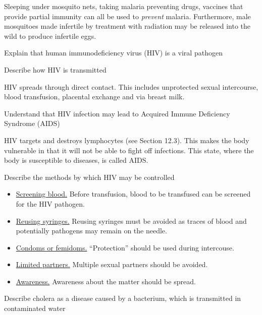 Sleeping under mosquito nets, taking malaria preventing drugs, vaccines that provide partial
immunity can all be used to \emph{prevent} malaria. Furthermore, male mosquitoes made infertile
by treatment with radiation may be released into the wild to produce infertile eggs.

\begin{point}
Explain that human immunodeficiency virus (HIV) is a viral pathogen
\end{point}

\begin{point}
Describe how HIV is transmitted
\end{point}

HIV spreads through direct contact. This includes unprotected sexual intercourse, blood 
transfusion, placental exchange and via breast milk.

\begin{point}
Understand that HIV infection may lead to Acquired Immune Deficiency Syndrome (AIDS)
\end{point}

HIV targets and destroys lymphocytes (see Section 12.3). This makes the body vulnerable in that
it will not be able to fight off infections. This state, where the body is susceptible to 
diseases, is called AIDS.

\begin{point}
Describe the methods by which HIV may be controlled
\end{point}

\begin{itemize}
\item\underline{Screening blood.} Before transfusion, blood to be transfused can be screened for the
HIV pathogen.

\item\underline{Reusing syringes.} Reusing syringes must be avoided as traces of blood and potentially
pathogens may remain on the needle.

\item\underline{Condoms or femidoms.} ``Protection'' should be used during intercouse.

\item\underline{Limited partners.} Multiple sexual partners should be avoided.

\item\underline{Awareness.} Awareness about the matter should be spread.
\end{itemize}

\begin{point}
Describe cholera as a disease caused by a bacterium, which is transmitted in contaminated water
\end{point}

